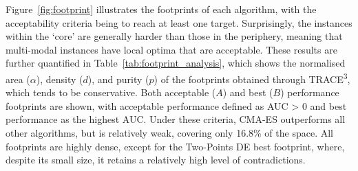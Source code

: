 \documentclass[acmsmall,screen,review,anonymous]{acmart}
\begin{document}
Figure~\ref{fig:footprint} illustrates the footprints of each algorithm, with the acceptability criteria being to reach at least one target. Surprisingly, the instances within the `core' are generally harder than those in the periphery, meaning that multi-modal instances have local optima that are acceptable. These results are further quantified in Table~\ref{tab:footprint_analysis}, which shows the normalised area ($\alpha$), density ($d$), and purity ($p$) of the footprints obtained through TRACE\textsuperscript{3}, which tends to be conservative. Both acceptable ($A$) and best ($B$) performance footprints are shown, with acceptable performance defined as AUC > 0 and best performance as the highest AUC. Under these criteria, CMA-ES outperforms all other algorithms, but is relatively weak, covering only 16.8\% of the space. All footprints are highly dense, except for the Two-Points DE best footprint, where, despite its small size, it retains a relatively high level of contradictions.
\end{document}
